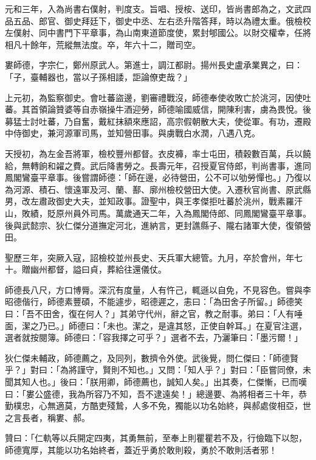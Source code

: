 \begin{pinyinscope}
 元和三年，入為尚書右僕射，判度支。旨唱、授桉、送印，皆尚書郎為之，文武四品五品、郎官、御史拜廷下，御史中丞、左右丞升階答拜，時以為禮太重。俄檢校左僕射、同中書門下平章事，為山南東道節度使，累封郇國公。以財交權幸，任將相凡十餘年，荒縱無法度。卒，年六十二，贈司空。



 婁師德，字宗仁，鄭州原武人。第進士，調江都尉。揚州長史盧承業異之，曰：「子，臺輔器也，當以子孫相諉，詎論僚吏哉？」



 上元初，為監察御史。會吐蕃盜邊，劉審禮戰沒，師德奉使收敗亡於洮河，因使吐蕃。其首領論贊婆等自赤嶺操牛酒迎勞，師德喻國威信，開陳利害，虜為畏悅。後募猛士討吐蕃，乃自奮，戴紅抹額來應詔，高宗假朝散大夫，使從軍。有功，遷殿中侍御史，兼河源軍司馬，並知營田事。與虜戰白水潤，八遇八克。



 天授初，為左金吾將軍，檢校豐州都督。衣皮褲，率士屯田，積穀數百萬，兵以饒給，無轉餉和糴之費。武后降書勞之。長壽元年，召授夏官侍郎，判尚書事，進同鳳閣鸞臺平章事。後嘗謂師德：「師在邊，必待營田，公不可以劬勞憚也。」乃復以為河源、積石、懷遠軍及河、蘭、鄯、廓州檢校營田大使。入遷秋官尚書、原武縣男，改左肅政御史大夫，並知政事。證聖中，與王孝傑拒吐蕃於洮州，戰素羅汗山，敗績，貶原州員外司馬。萬歲通天二年，入為鳳閣侍郎、同鳳閣鸞臺平章事。後與武懿宗、狄仁傑分道撫定河北，進納言，更封譙縣子、隴右諸軍大使，復領營田。



 聖歷三年，突厥入寇，詔檢校並州長史、天兵軍大總管。九月，卒於會州，年七十。贈幽州都督，謚曰貞，葬給往還儀仗。



 師德長八尺，方口博脣。深沉有度量，人有忤己，輒遜以自免，不見容色。嘗與李昭德偕行，師德素豐碩，不能遽步，昭德遲之，恚曰：「為田舍子所留。」師德笑曰：「吾不田舍，復在何人？」其弟守代州，辭之官，教之耐事。弟曰：「人有唾面，潔之乃已。」師德曰：「未也。潔之，是違其怒，正使自幹耳。」在夏官注選，選者就按閱簿。師德曰：「容我擇之可乎？」選者不去，乃灑筆曰：「墨污爾！」



 狄仁傑未輔政，師德薦之，及同列，數擠令外使。武後覺，問仁傑曰：「師德賢乎？」對曰：「為將謹守，賢則不知也。」又問：「知人乎？」對曰：「臣嘗同僚，未聞其知人也。」後曰：「朕用卿，師德薦也，誠知人矣。」出其奏，仁傑慚，已而嘆曰：「婁公盛德，我為所容乃不知，吾不逮遠矣！」總邊要、為將相者三十年，恭勤樸忠，心無適莫，方酷吏殘鷙，人多不免，獨能以功名始終，與郝處俊相亞，世之言長者，稱婁、郝。



 贊曰：「仁軌等以兵開定四夷，其勇無前，至奉上則瞿瞿若不及，行儉臨下以恕，師德寬厚，其能以功名始終者，蓋近乎勇於敢則殺，勇於不敢則活者邪！



\end{pinyinscope}